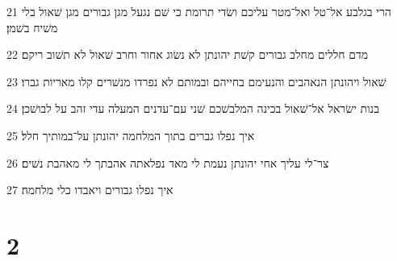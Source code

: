 \par 21 הרי בגלבע אל־טל ואל־מטר עליכם ושׂדי תרומת כי שׁם נגעל מגן גבורים מגן שׁאול בלי משׁיח בשׁמן׃
\par 22 מדם חללים מחלב גבורים קשׁת יהונתן לא נשׂוג אחור וחרב שׁאול לא תשׁוב ריקם׃
\par 23 שׁאול ויהונתן הנאהבים והנעימם בחייהם ובמותם לא נפרדו מנשׁרים קלו מאריות גברו׃
\par 24 בנות ישׂראל אל־שׁאול בכינה המלבשׁכם שׁני עם־עדנים המעלה עדי זהב על לבושׁכן׃
\par 25 איך נפלו גברים בתוך המלחמה יהונתן על־במותיך חלל׃
\par 26 צר־לי עליך אחי יהונתן נעמת לי מאד נפלאתה אהבתך לי מאהבת נשׁים׃
\par 27 איך נפלו גבורים ויאבדו כלי מלחמה׃

\chapter{2}

